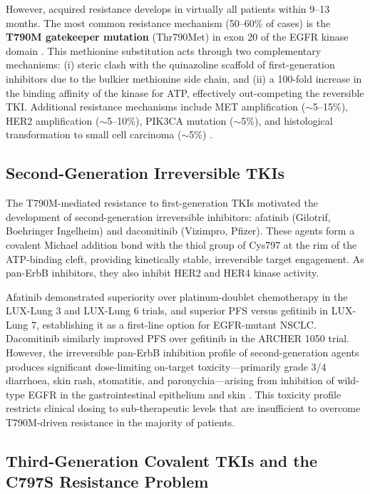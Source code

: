 However, acquired resistance develops in virtually all patients within 9--13 months.
The most common resistance mechanism (50--60\% of cases) is the \textbf{T790M
gatekeeper mutation} (Thr790Met) in exon 20 of the EGFR kinase domain
\parencite{leonetti2019resistance}. This methionine substitution acts through
two complementary mechanisms: (i) steric clash with the quinazoline scaffold
of first-generation inhibitors due to the bulkier methionine side chain, and
(ii) a 100-fold increase in the binding affinity of the kinase for ATP, effectively
out-competing the reversible TKI. Additional resistance mechanisms include MET
amplification ($\sim$5--15\%), HER2 amplification ($\sim$5--10\%), PIK3CA
mutation ($\sim$5\%), and histological transformation to small cell carcinoma
($\sim$5\%) \parencite{leonetti2019resistance}.

\subsection{Second-Generation Irreversible TKIs}

The T790M-mediated resistance to first-generation TKIs motivated the development
of second-generation irreversible inhibitors: afatinib (Gilotrif, Boehringer
Ingelheim) and dacomitinib (Vizimpro, Pfizer). These agents form a covalent
Michael addition bond with the thiol group of Cys797 at the rim of the ATP-binding
cleft, providing kinetically stable, irreversible target engagement. As pan-ErbB
inhibitors, they also inhibit HER2 and HER4 kinase activity.

Afatinib demonstrated superiority over platinum-doublet chemotherapy in the LUX-Lung
3 and LUX-Lung 6 trials, and superior PFS versus gefitinib in LUX-Lung 7, establishing
it as a first-line option for EGFR-mutant NSCLC. Dacomitinib similarly improved
PFS over gefitinib in the ARCHER 1050 trial. However, the irreversible
pan-ErbB inhibition profile of second-generation agents produces significant
dose-limiting on-target toxicity---primarily grade 3/4 diarrhoea, skin rash,
stomatitis, and paronychia---arising from inhibition of wild-type EGFR in the
gastrointestinal epithelium and skin \parencite{leonetti2019resistance}.
This toxicity profile restricts clinical dosing to sub-therapeutic levels that
are insufficient to overcome T790M-driven resistance in the majority of patients.

\subsection{Third-Generation Covalent TKIs and the C797S Resistance Problem}

